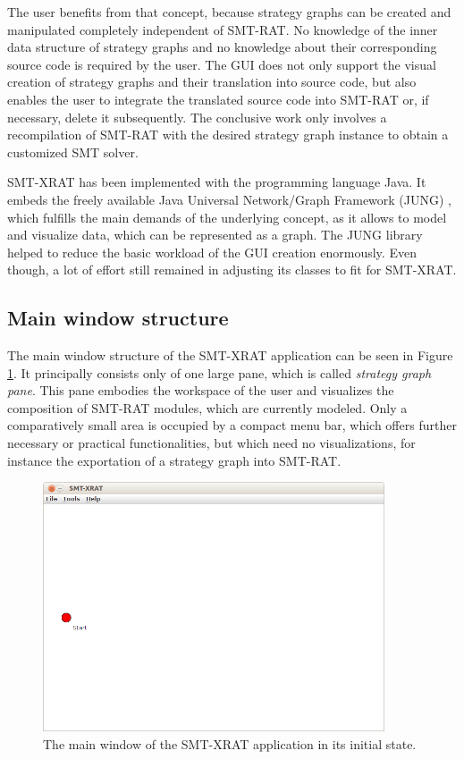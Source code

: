 The user benefits from that concept, because strategy graphs can be created and manipulated completely independent of SMT-RAT. No knowledge of the inner data structure of strategy graphs and no knowledge about their corresponding source code is required by the user. The GUI does not only support the visual creation of strategy graphs and their translation into source code, but also enables the user to integrate the translated source code into SMT-RAT or, if necessary, delete it subsequently. The conclusive work only involves a recompilation of SMT-RAT with the desired strategy graph instance to obtain a customized SMT solver.

SMT-XRAT has been implemented with the programming language Java. It embeds the freely available Java Universal Network/Graph Framework (JUNG) \cite{JUNG}, which fulfills the main demands of the underlying concept, as it allows to model and visualize data, which can be represented as a graph. The JUNG library helped to reduce the basic workload of the GUI creation enormously. Even though, a lot of effort still remained in adjusting its classes to fit for SMT-XRAT.

\subsection{Main window structure}
\label{sec:main_window_structure_of_smt-xrat}
The main window structure of the SMT-XRAT application can be seen in Figure \ref{fig:smt-xrat_main_window}. It principally consists only of one large pane, which is called \emph{strategy graph pane}. This pane embodies the workspace of the user and visualizes the composition of SMT-RAT modules, which are currently modeled. Only a comparatively small area is occupied by a compact menu bar, which offers further necessary or practical functionalities, but which need no visualizations, for instance the exportation of a strategy graph into SMT-RAT.
\begin{figure}
  \begin{center}
    \includegraphics[width=0.9\textwidth]{graphics/smt-xrat_main_window.png}
  \end{center}
  \caption{The main window of the SMT-XRAT application in its initial state.}
  \label{fig:smt-xrat_main_window}
\end{figure}

